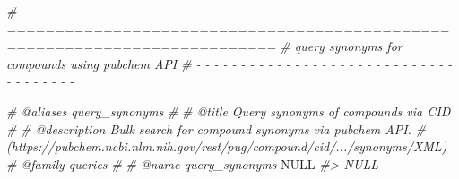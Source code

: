 \documentclass[
]{article}
\newenvironment{Shaded}{\begin{snugshade}}{\end{snugshade}}
\newcommand{\CommentTok}[1]{\textcolor[rgb]{0.56,0.35,0.01}{\textit{#1}}}
\newcommand{\ConstantTok}[1]{\textcolor[rgb]{0.00,0.00,0.00}{#1}}
\begin{document}
\begin{Shaded}
\begin{Highlighting}[]
\CommentTok{\# ==========================================================================}
\CommentTok{\# query synonyms for compounds using pubchem API}
\CommentTok{\# {-} {-} {-} {-} {-} {-} {-} {-} {-} {-} {-} {-} {-} {-} {-} {-} {-} {-} {-} {-} {-} {-} {-} {-} {-} {-} {-} {-} {-} {-} {-} {-} {-} {-} {-} {-} {-}}

\CommentTok{\#\textquotesingle{} @aliases query\_synonyms}
\CommentTok{\#\textquotesingle{}}
\CommentTok{\#\textquotesingle{} @title Query synonyms of compounds via CID}
\CommentTok{\#\textquotesingle{}}
\CommentTok{\#\textquotesingle{} @description Bulk search for compound synonyms via pubchem API.}
\CommentTok{\#\textquotesingle{} (https://pubchem.ncbi.nlm.nih.gov/rest/pug/compound/cid/.../synonyms/XML)}
\CommentTok{\#\textquotesingle{} @family queries}
\CommentTok{\#\textquotesingle{}}
\CommentTok{\#\textquotesingle{} @name query\_synonyms}
\ConstantTok{NULL}
\CommentTok{\#\textgreater{} NULL}


\end{Highlighting}
\end{Shaded}
\end{document}
